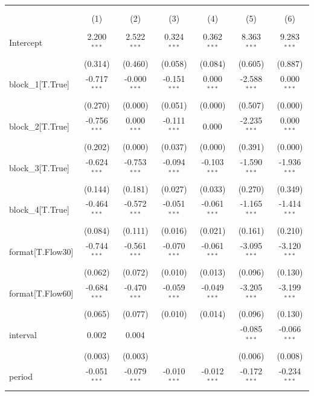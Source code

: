 \begin{table}[!htbp] \centering
\begin{tabular}{@{\extracolsep{5pt}}lcccccc}
\\[-1.8ex]\hline
\hline \\[-1.8ex]
\\[-1.8ex] & (1) & (2) & (3) & (4) & (5) & (6) \\
\hline \\[-1.8ex]
 Intercept & 2.200$^{***}$ & 2.522$^{***}$ & 0.324$^{***}$ & 0.362$^{***}$ & 8.363$^{***}$ & 9.283$^{***}$ \\
& (0.314) & (0.460) & (0.058) & (0.084) & (0.605) & (0.887) \\
 block_1[T.True] & -0.717$^{***}$ & -0.000$^{***}$ & -0.151$^{***}$ & 0.000$^{***}$ & -2.588$^{***}$ & 0.000$^{***}$ \\
& (0.270) & (0.000) & (0.051) & (0.000) & (0.507) & (0.000) \\
 block_2[T.True] & -0.756$^{***}$ & 0.000$^{***}$ & -0.111$^{***}$ & 0.000$^{}$ & -2.235$^{***}$ & 0.000$^{***}$ \\
& (0.202) & (0.000) & (0.037) & (0.000) & (0.391) & (0.000) \\
 block_3[T.True] & -0.624$^{***}$ & -0.753$^{***}$ & -0.094$^{***}$ & -0.103$^{***}$ & -1.590$^{***}$ & -1.936$^{***}$ \\
& (0.144) & (0.181) & (0.027) & (0.033) & (0.270) & (0.349) \\
 block_4[T.True] & -0.464$^{***}$ & -0.572$^{***}$ & -0.051$^{***}$ & -0.061$^{***}$ & -1.165$^{***}$ & -1.414$^{***}$ \\
& (0.084) & (0.111) & (0.016) & (0.021) & (0.161) & (0.210) \\
 format[T.Flow30] & -0.744$^{***}$ & -0.561$^{***}$ & -0.070$^{***}$ & -0.061$^{***}$ & -3.095$^{***}$ & -3.120$^{***}$ \\
& (0.062) & (0.072) & (0.010) & (0.013) & (0.096) & (0.130) \\
 format[T.Flow60] & -0.684$^{***}$ & -0.470$^{***}$ & -0.059$^{***}$ & -0.049$^{***}$ & -3.205$^{***}$ & -3.199$^{***}$ \\
& (0.065) & (0.077) & (0.010) & (0.014) & (0.096) & (0.130) \\
 interval & 0.002$^{}$ & 0.004$^{}$ & & & -0.085$^{***}$ & -0.066$^{***}$ \\
& (0.003) & (0.003) & & & (0.006) & (0.008) \\
 period & -0.051$^{***}$ & -0.079$^{***}$ & -0.010$^{***}$ & -0.012$^{***}$ & -0.172$^{***}$ & -0.234$^{***}$ \\

\end{tabular}
\end{table}
